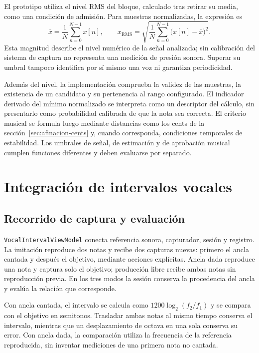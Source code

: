El prototipo utiliza el nivel RMS del bloque, calculado tras retirar su media,
como una condición de admisión. Para muestras normalizadas, la expresión es
\begin{equation}
  \overline{x}=\frac{1}{N}\sum_{n=0}^{N-1}x[n],\qquad
  x_{\mathrm{RMS}}=\sqrt{\frac{1}{N}\sum_{n=0}^{N-1}
  \bigl(x[n]-\overline{x}\bigr)^2}.
  \label{eq:rms-bloque}
\end{equation}
Esta magnitud describe el nivel numérico de la señal analizada; sin calibración
del sistema de captura no representa una medición de presión sonora. Superar su
umbral tampoco identifica por sí mismo una voz ni garantiza periodicidad.

Además del nivel, la implementación comprueba la validez de las muestras, la
existencia de un candidato y su pertenencia al rango configurado. El indicador
derivado del mínimo normalizado se interpreta como un descriptor del cálculo,
sin presentarlo como probabilidad calibrada de que la nota sea correcta. El
criterio musical se formula luego mediante distancias como los cents de la
sección~\ref{sec:afinacion-cents} y, cuando corresponda, condiciones temporales
de estabilidad. Los umbrales de señal, de estimación y de aprobación musical
cumplen funciones diferentes y deben evaluarse por separado.

\section{Integración de intervalos vocales}
\label{sec:implementacion-intervalos}
\subsection{Recorrido de captura y evaluación}
\texttt{VocalIntervalViewModel} conecta referencia sonora, capturador, sesión
y registro. La imitación reproduce dos notas y recibe dos capturas nuevas:
primero el ancla cantada y después el objetivo, mediante acciones explícitas.
Ancla dada reproduce una nota y captura solo el objetivo; producción libre
recibe ambas notas sin reproducción previa. En los tres modos la sesión
conserva la procedencia del ancla y evalúa la relación que corresponde.

Con ancla cantada, el intervalo se calcula como
\(1200\log_2(f_2/f_1)\) y se compara con el objetivo en semitonos. Trasladar
ambas notas al mismo tiempo conserva el intervalo, mientras que un desplazamiento
de octava en una sola conserva su error. Con ancla dada, la comparación utiliza
la frecuencia de la referencia reproducida, sin inventar mediciones de una
primera nota no cantada.

